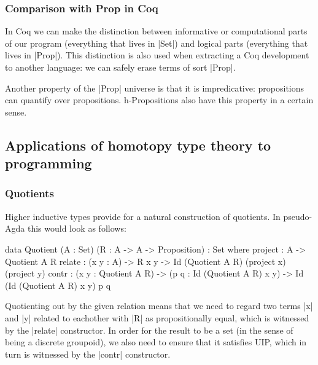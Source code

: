 
\subsubsection{Comparison with Prop in Coq}


In Coq we can make the distinction between informative or
computational parts of our program (everything that lives in |Set|)
and logical parts (everything that lives in |Prop|). This distinction
is also used when extracting a Coq development to another language: we
can safely erase terms of sort |Prop|.

Another property of the |Prop| universe is that it is impredicative:
propositions can quantify over propositions. h-Propositions also have
this property in a certain sense.


\subsection{Applications of homotopy type theory to programming}
\label{sec:contrib-hott-applications}


\subsubsection{Quotients}


Higher inductive types provide for a natural construction of
quotients. In pseudo-Agda this would look as follows:

\begin{code}
data Quotient (A : Set) (R : A -> A -> Proposition) : Set where
  project  : A -> Quotient A R
  relate   : (x y : A) -> R x y -> Id (Quotient A R) (project x) (project y)
  contr    : (x y : Quotient A R)  -> (p q : Id (Quotient A R) x y) 
                                   -> Id (Id (Quotient A R) x y) p q
\end{code}

Quotienting out by the given relation means that we need to regard two
terms |x| and |y| related to eachother with |R| as propositionally
equal, which is witnessed by the |relate| constructor. In order for
the result to be a set (in the sense of being a discrete groupoid), we
also need to ensure that it satisfies UIP, which in turn is witnessed
by the |contr| constructor.

